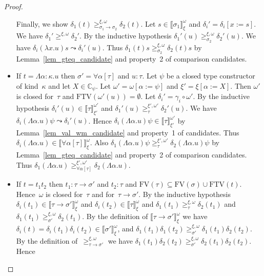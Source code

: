 \documentclass[runningheads,a4paper]{llncs}
\newcommand{\arrtype}{\rightarrow}
\newcommand{\abs}[2]{\lambda #1.#2}
\newcommand{\tabs}[2]{\Lambda #1.#2}
\newcommand{\subst}[2]{#1:=#2}
\newcommand{\FTV}{\mathrm{FTV}}
\newcommand{\FV}{\mathrm{FV}}
\newcommand{\Cb}{\mathbb{C}}
\newcommand{\val}[3]{\ensuremath{\llbracket#1\rrbracket_{#2}^{#3}}}
\newcommand{\gteq}[3]{\ensuremath{\ge_{#1}^{#2,#3}}}
\begin{document}
\begin{proof}
\begin{itemize}
    Finally, we show $\delta_1(t)
    \gteq{\sigma_1\arrtype\sigma_2}{\xi}{\omega} \delta_2(t)$. Let $s
    \in \val{\sigma_1}{\xi}{\omega}$ and
    $\delta_i'=\delta_i[\subst{x}{s}]$. We have $\delta_1'
    \gteq{}{\xi}{\omega} \delta_2'$. By the inductive hypothesis
    $\delta_1'(u) \gteq{\sigma_2}{\xi}{\omega} \delta_2'(u)$. We have
    $\delta_i(\abs{x}{u}) s \leadsto \delta_i'(u)$. Thus $\delta_1(t)
    s \gteq{\sigma_2}{\xi}{\omega} \delta_2(t) s$ by
    Lemma~\ref{lem_gteq_candidate} and property~2 of comparison
    candidates.
  \item If $t = \tabs{\alpha:\kappa}{u}$ then $\sigma' =
    \forall\alpha[\tau]$ and $u : \tau$. Let $\psi$ be a closed type
    constructor of kind~$\kappa$ and let $X \in \Cb_\psi$. Let
    $\omega' = \omega[\subst{\alpha}{\psi}]$ and
    $\xi'=\xi[\subst{\alpha}{X}]$. Then $\omega'$ is closed for~$\tau$
    and $\FTV(\omega'(u)) = \emptyset$. Let
    $\delta_i'=\gamma_i\circ\omega'$. By the inductive hypothesis
    $\delta_i'(u) \in \val{\tau}{\xi'}{\omega'}$ and $\delta_1'(u)
    \gteq{\tau}{\xi'}{\omega'} \delta_2'(u)$. We have
    $\delta_i(\tabs{\alpha}{u}) \psi \leadsto \delta_i'(u)$. Hence
    $\delta_i(\tabs{\alpha}{u}) \psi \in \val{\tau}{\xi'}{\omega'}$ by
    Lemma~\ref{lem_val_wm_candidate} and property~1 of
    candidates. Thus $\delta_i(\tabs{\alpha}{u}) \in
    \val{\forall\alpha[\tau]}{\xi}{\omega}$. Also
    $\delta_1(\tabs{\alpha}{u}) \psi \gteq{\tau}{\xi'}{\omega'}
    \delta_2(\tabs{\alpha}{u}) \psi$ by Lemma~\ref{lem_gteq_candidate}
    and property~2 of comparison candidates. Thus
    $\delta_1(\tabs{\alpha}{u})
    \gteq{\forall\alpha[\tau]}{\xi'}{\omega'}
    \delta_2(\tabs{\alpha}{u})$.
  \item If $t = t_1 t_2$ then $t_1 : \tau\arrtype\sigma'$ and $t_2 :
    \tau$ and $\FV(\tau) \subseteq \FV(\sigma) \cup
    \FTV(t)$. Hence~$\omega$ is closed for~$\tau$ and
    for~$\tau\arrtype\sigma'$. By the inductive hypothesis
    $\delta_i(t_1) \in \val{\tau\arrtype\sigma'}{\xi}{\omega}$ and
    $\delta_i(t_2) \in \val{\tau}{\xi}{\omega}$ and $\delta_1(t_1)
    \gteq{\tau}{\xi}{\omega} \delta_2(t_1)$ and $\delta_1(t_1)
    \gteq{\sigma'}{\xi}{\omega} \delta_2(t_1)$. By the definition of
    $\val{\tau\arrtype\sigma'}{\xi}{\omega}$ we have $\delta_i(t) =
    \delta_i(t_1)\delta_i(t_2) \in \val{\sigma'}{\xi}{\omega}$, and
    $\delta_1(t_1)\delta_1(t_2) \gteq{\sigma'}{\xi}{\omega}
    \delta_1(t_1)\delta_2(t_2)$. By the definition
    of~$\gteq{\tau\arrtype\sigma'}{\xi}{\omega}$ we have
    $\delta_1(t_1)\delta_2(t_2)\gteq{\sigma'}{\xi}{\omega}\delta_2(t_1)\delta_2(t_2)$. Hence

\end{itemize}
\end{proof}
\end{document}
